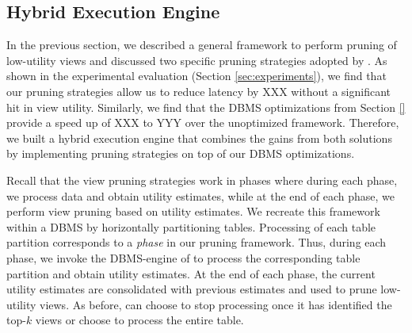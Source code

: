 \subsection{Hybrid Execution Engine}
\label{sec:hybrid_exectution_engine}

In the previous section, we described a general framework to perform pruning of low-utility views and discussed two specific pruning strategies adopted by \SeeDB.
As shown in the experimental evaluation (Section \ref{sec:experiments}), we find that
our pruning strategies allow us to reduce latency by XXX without a significant hit in view utility.
Similarly, we find that the DBMS optimizations from Section \ref{} provide a speed up of XXX to YYY over the unoptimized framework. 
Therefore, we built a hybrid execution engine that combines the gains from both solutions by implementing pruning strategies on top of our DBMS optimizations. 


Recall that the view pruning strategies work in phases where during each phase, we process data and obtain utility estimates, while at the end of each phase, we perform view pruning based on utility estimates.
We recreate this framework within a DBMS by horizontally partitioning tables.
Processing of each table partition corresponds to a {\it phase} in our pruning framework. 
Thus, during each phase, we invoke the DBMS-engine of \SeeDB to process the corresponding table partition and obtain utility estimates.
At the end of each phase, the current utility estimates are consolidated with previous estimates and used to prune low-utility views.
As before, \SeeDB can choose to stop processing once it has identified the top-$k$ views or choose to process the entire table.


